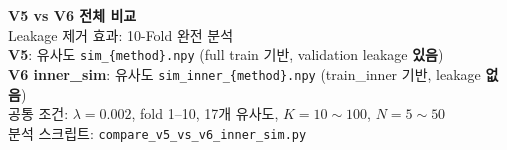 \documentclass[aspectratio=169,10pt]{beamer}
\begin{document}
\begin{frame}[plain]
	\begin{center}
		\vspace{1.8cm}
		{\LARGE \textbf{V5 vs V6 전체 비교}}\\[0.8em]
		{\large Leakage 제거 효과: 10-Fold 완전 분석}\\[0.6em]
		{\small
		\textbf{V5}: 유사도 \texttt{sim\_\{method\}.npy} (full train 기반, validation leakage \textbf{있음})\\[0.3em]
		\textbf{V6 inner\_sim}: 유사도 \texttt{sim\_inner\_\{method\}.npy} (train\_inner 기반, leakage \textbf{없음})\\[0.6em]
		공통 조건: $\lambda=0.002$, fold 1--10, 17개 유사도, $K=10\sim100$, $N=5\sim50$\\
		분석 스크립트: \texttt{compare\_v5\_vs\_v6\_inner\_sim.py}
		}
	\end{center}
\end{frame}
\end{document}
